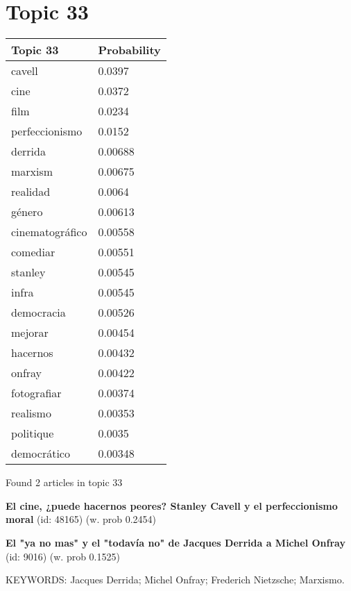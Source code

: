 \documentclass{article}
\begin{document}
\centering
\thispagestyle{empty}
\section*{Topic 33}\vfill
\begin{tabular}{ll}
\toprule
        Topic 33 & Probability \\
\midrule
          cavell &      0.0397 \\
            cine &      0.0372 \\
            film &      0.0234 \\
  perfeccionismo &      0.0152 \\
         derrida &     0.00688 \\
         marxism &     0.00675 \\
        realidad &      0.0064 \\
          género &     0.00613 \\
 cinematográfico &     0.00558 \\
        comediar &     0.00551 \\
         stanley &     0.00545 \\
           infra &     0.00545 \\
      democracia &     0.00526 \\
         mejorar &     0.00454 \\
        hacernos &     0.00432 \\
          onfray &     0.00422 \\
     fotografiar &     0.00374 \\
        realismo &     0.00353 \\
       politique &      0.0035 \\
     democrático &     0.00348 \\
\bottomrule
\end{tabular}

\vfill
Found 2 articles in topic 33
\vfill

\textbf{El cine, ¿puede hacernos peores? Stanley Cavell y el perfeccionismo moral} (id: 48165)
 (w. prob 0.2454)
\vfill

\textbf{El "ya no mas" y el "todavía no" de Jacques Derrida a Michel Onfray} (id: 9016)
 (w. prob 0.1525)


KEYWORDS:
Jacques Derrida; Michel Onfray; Frederich Nietzsche; Marxismo.

\vfill
\newpage


\centering
\thispagestyle{empty}
\end{document}

